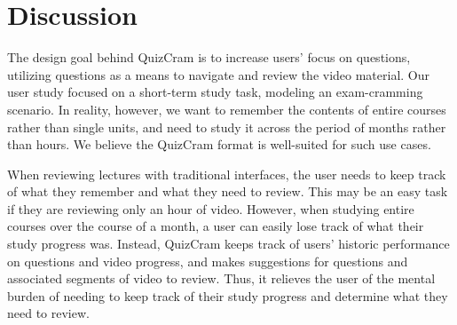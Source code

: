 \documentclass{sigchi}
\begin{document}


\section{Discussion}


The design goal behind QuizCram is to increase users' focus on questions, utilizing questions as a means to navigate and review the video material. Our user study focused on a short-term study task, modeling an exam-cramming scenario. In reality, however, we want to remember the contents of entire courses rather than single units, and need to study it across the period of months rather than hours. We believe the QuizCram format is well-suited for such use cases.

When reviewing lectures with traditional interfaces, the user needs to keep track of what they remember and what they need to review. This may be an easy task if they are reviewing only an hour of video. However, when studying entire courses over the course of a month, a user can easily lose track of what their study progress was. Instead, QuizCram keeps track of users' historic performance on questions and video progress, and makes suggestions for questions and associated segments of video to review. Thus, it relieves the user of the mental burden of needing to keep track of their study progress and determine what they need to review.
\end{document}
